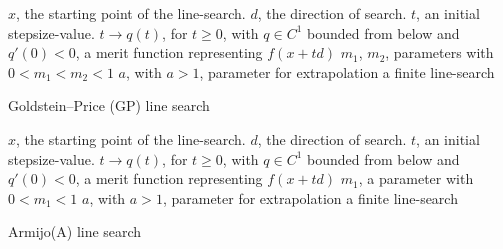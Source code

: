 \begin{algorithm}
  \begin{algorithmic}
    {\sf
      \REQUIRE $x$, the starting point of the line-search.
      \REQUIRE $d$, the direction of search.
      \REQUIRE $t$, an initial stepsize-value.
      \REQUIRE $t \to q(t)$, for $t \geq 0$, with $q \in C^1$ bounded from below and $q'(0) < 0$, a merit function representing $f(x + t d)$
      \REQUIRE $m_1$, $m_2$, parameters with $0 < m_1 < m_2 < 1$
      \REQUIRE $a$, with $a > 1$, parameter for extrapolation
      \ENSURE a finite line-search

      \ENDIF
      \ENDIF

      \ELSE
      \ENDIF
      \ENDWHILE
    }
  \end{algorithmic}
  \caption{Goldstein--Price (GP) line search}  \label{Algo:GP}
\end{algorithm}

\begin{algorithm}
  \begin{algorithmic}
    {\sf
      \REQUIRE $x$, the starting point of the line-search.
      \REQUIRE $d$, the direction of search.
      \REQUIRE $t$, an initial stepsize-value.
      \REQUIRE $t \to q(t)$, for $t \geq 0$, with $q \in C^1$ bounded from below and $q'(0) < 0$, a merit function representing $f(x + t d)$
      \REQUIRE $m_1$, a parameter with $0 < m_1 < 1$
      \REQUIRE $a$, with $a > 1$, parameter for extrapolation
      \ENSURE a finite line-search
      \ELSE
      \ENDIF
      \ENDWHILE
    }
  \end{algorithmic}
  \caption{Armijo(A) line search}  \label{Algo:A}
\end{algorithm}





